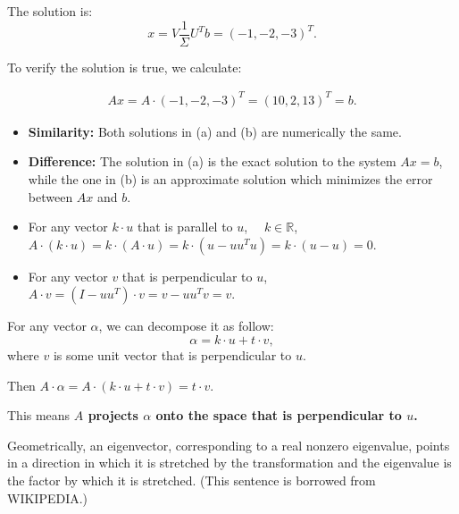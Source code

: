 \documentclass[
  course = {{16-811 Math Fundamentals for Robotics}},
  quartile = {{1}},
  assignment = 1,
  name = {{Kangle Deng}},
  email = {{kangled@andrew.cmu.edu}},
  firstexercise = 1
]{aga-homework}
\begin{document}
The solution is:
\begin{equation*}
    x = V \frac{1}{\Sigma} U^T b = (-1, -2, -3)^T.
\end{equation*}

To verify the solution is true, we calculate:

\begin{equation*}
\begin{aligned}
    Ax = A \cdot (-1, -2, -3)^T = (10, 2, 13)^T = b.
\end{aligned}
\end{equation*}

\subexercise
\begin{itemize}
    \item \textbf{Similarity:} Both solutions in (a) and (b) are numerically the same. 
    \item \textbf{Difference:} The solution in (a) is the exact solution to the system $Ax=b$, while the one in (b) is an approximate solution which minimizes the error between $Ax$ and $b$.
\end{itemize}

\exercise
\subexercise
\begin{itemize}
    \item For any vector $k \cdot u$ that is parallel to $u$, $\quad k \in \mathbb{R}$, \\
    $A \cdot (k \cdot u) = k \cdot (A \cdot u) = k \cdot (u - uu^Tu) = k \cdot (u - u) = 0$.
    \item For any vector $v$ that is perpendicular to $u$, \\
    $A \cdot v = (I - uu^T)\cdot v = v - uu^Tv = v$.
\end{itemize}

For any vector $\alpha$, we can decompose it as follow:
\begin{equation*}
    \alpha = k \cdot u + t \cdot v,
\end{equation*}
where $v$ is some unit vector that is perpendicular to $u$.

Then $A\cdot \alpha = A \cdot (k \cdot u + t \cdot v) = t \cdot v$.

This means \textbf{$A$ projects $\alpha$ onto the space that is perpendicular to $u$.}

\subexercise
Geometrically, an eigenvector, corresponding to a real nonzero eigenvalue, points in a direction in which it is stretched by the transformation and the eigenvalue is the factor by which it is stretched. (This sentence is borrowed from WIKIPEDIA.)
\end{document}
